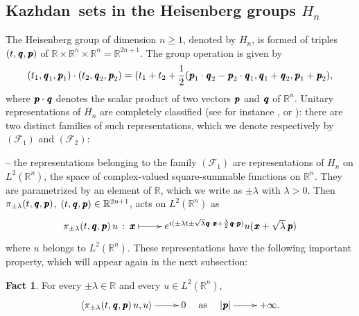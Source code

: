 \documentclass[11pt,english,a4paper]{smfart}
\numberwithin{equation}{section}
\theoremstyle{definition}
\newtheorem{fact}[theorem]{Fact}
\begin{document}
\subsection{{Kazhdan}\ sets in the Heisenberg groups $H_{n}$}\label{Subsection 8.2}
The Heisenberg group  of dimension $n\ge 1$, denoted by $H_{n}$, is formed of triples $(t,{\mkern 1.5 mu\pmb{q}},{\mkern 1.5 mu\pmb{p}})$ of ${\ensuremath{\mathbb R}}\times {\ensuremath{\mathbb R}}^{n}\times{\ensuremath{\mathbb R}}^{n}={\ensuremath{\mathbb R}}^{2n+1}$. The group operation is given by
\[
(t_{1},{\mkern 1.5 mu\pmb{q}}_{1},{\mkern 1.5 mu\pmb{p}}_{1})\cdot (t_{2},{\mkern 1.5 mu\pmb{q}}_{2},{\mkern 1.5 mu\pmb{p}}_{2})=(t_{1}+t_{2}+\frac{1}{2}(
{\mkern 1.5 mu\pmb{p}}_{1}\cdot {\mkern 1.5 mu\pmb{q}}_{2}-{\mkern 1.5 mu\pmb{p}}_{2}\cdot{\mkern 1.5 mu\pmb{q}}_{1},{\mkern 1.5 mu\pmb{q}}_{1}+{\mkern 1.5 mu\pmb{q}}_{2},{\mkern 1.5 mu\pmb{p}}_{1}+{\mkern 1.5 mu\pmb{p}}_{2}),
\]
where ${\mkern 1.5 mu\pmb{p}}\cdot{\mkern 1.5 mu\pmb{q}}$ denotes the scalar product of two vectors ${\mkern 1.5 mu\pmb{p}}$ and ${\mkern 1.5 mu\pmb{q}}$ of ${\ensuremath{\mathbb R}}^{n}$.
Unitary representations of $H_{n}$ are completely classified (see for instance \cite[Ch.~2]{T}, or \cite[Sec.~6.6]{Fo}): there are two distinct families of such representations, which we denote respectively by $(\mathcal{F}_{1})$ and $(\mathcal{F}_{2})$:
\par\smallskip 
-- the representations belonging to the family $(\mathcal{F}_{1})$ are representations of $H_{n}$ on $L^{2}({\ensuremath{\mathbb R}}^{n})$, the space of complex-valued square-summable functions on ${\ensuremath{\mathbb R}}^{n}$. They are parametrized by an element of ${\ensuremath{\mathbb R}}$, which we write as $\pm\lambda $ with $\lambda >0$. Then 
$\pi _{\pm\lambda }(t,{\mkern 1.5 mu\pmb{q}},{\mkern 1.5 mu\pmb{p}})$, $(t,{\mkern 1.5 mu\pmb{q}},{\mkern 1.5 mu\pmb{p}})\in{\ensuremath{\mathbb R}}^{2n+1}$, acts on $L^{2}({\ensuremath{\mathbb R}}^{n})$ as
\[
\xymatrix{
\pi _{\pm\lambda }(t,{\mkern 1.5 mu\pmb{q}},{\mkern 1.5 mu\pmb{p}})\,u\,:\,{\mkern 1.5 mu\pmb{x}}\ar@{|->}[r]&e^{i(\pm\lambda t\pm\sqrt{\lambda }{\mkern 1.5 mu\pmb{q}}\cdot {\mkern 1.5 mu\pmb{x}}+\frac{\lambda }{2}{\mkern 1.5 mu\pmb{q}}\cdot{\mkern 1.5 mu\pmb{p}})}u({\mkern 1.5 mu\pmb{x}}+\sqrt{\lambda }\,{\mkern 1.5 mu\pmb{p}})
}
\]
where $u$ belongs to $L^{2}({\ensuremath{\mathbb R}}^{n})$. 
These representations have the following important property, which will appear again in the next subsection:
\begin{fact}\label{Fact E}
 For every $\pm\lambda \in{\ensuremath{\mathbb R}}$ and every $u\in L^{2}({\ensuremath{\mathbb R}}^{n})$, 
\[
\xymatrix{{\ensuremath{{\langle {\pi _{\pm\lambda }(t,{\mkern 1.5 mu\pmb{q}},{\mkern 1.5 mu\pmb{p}})\,u},{u}\rangle}}}\ar[r]&0}\quad\textrm{as}\quad
\xymatrix{|{\mkern 1.5 mu\pmb{p}}|\ar[r]&+\infty .}
\]
\end{fact}
\end{document}
